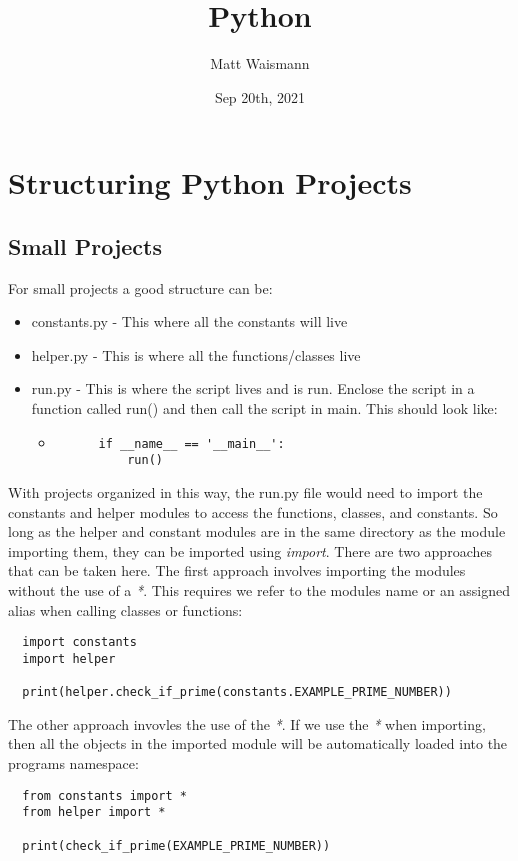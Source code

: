 \documentclass{article}%
\title{Python}
\date{Sep 20th, 2021}
\author{Matt Waismann}
\begin{document}
\maketitle

\section{Structuring Python Projects}
\subsection{Small Projects}
For small projects a good structure can be:
\begin{itemize}
  \item constants.py - This where all the constants will live
  \item helper.py - This is where all the functions/classes live
  \item run.py - This is where the script lives and is run. Enclose the script in a function called run() and then call the script in main. This should look like:
  \begin{itemize}
    \item \begin{lstlisting}
      if __name__ == '__main__':
          run()
    \end{lstlisting}
  \end{itemize}
\end{itemize}
With projects organized in this way, the run.py file would need to import the constants and helper modules to access the functions, classes, and constants. So long as the helper and constant modules are in the same directory as the module importing them,
they can be imported using \textit{import}. There are two approaches that can be taken here. The first approach involves importing the modules without the use of a \textit{*}. This requires we refer
to the modules name or an assigned alias when calling classes or functions:
\begin{lstlisting}
  import constants
  import helper

  print(helper.check_if_prime(constants.EXAMPLE_PRIME_NUMBER))
\end{lstlisting}
\noindent The other approach invovles the use of the \textit{*}. If we use the \textit{*} when importing, then all the objects in the imported module
will be automatically loaded into the programs namespace:
\begin{lstlisting}
  from constants import *
  from helper import *

  print(check_if_prime(EXAMPLE_PRIME_NUMBER))
\end{lstlisting}
\end{document}
